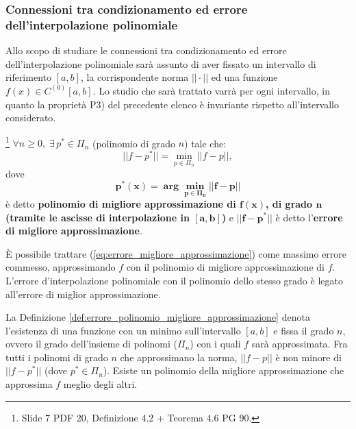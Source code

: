 \subsubsection{Connessioni tra condizionamento ed errore dell'interpolazione polinomiale}
\footnotemark Allo scopo di studiare le connessioni tra condizionamento ed errore dell'interpolazione polinomiale sarà assunto di aver fissato un intervallo di riferimento $[a,b]$, la corrispondente norma $||\cdot||$ ed una funzione $f(x)\in C^{(0)}[a,b]$. Lo studio che sarà trattato varrà per ogni intervallo, in quanto la proprietà P3) del precedente elenco è invariante rispetto all'intervallo considerato.

\begin{definition}\label{def:errore_polinomio_migliore_approssimazione}\footnote{Slide 7 PDF 20, Definizione 4.2 + Teorema 4.6 PG 90.}
    $\forall n\geq 0,\;\exists\, p^*\in\Pi_n$ (polinomio di grado $n$) tale che:
    \begin{equation}\label{eq:errore_migliore_approssimazione}
        ||f-p^*||=\underset{p\in\Pi_n}{\min}||f-p||,
    \end{equation}
    dove
    \begin{equation*}
    	\boldsymbol{p^*(x) = \arg\underset{p\in\Pi_n}{\min}||f-p||}
    \end{equation*}
    è detto \textbf{polinomio di migliore approssimazione di $\boldsymbol{f(x)}$, di grado $\boldsymbol n$ (tramite le ascisse di interpolazione in $\boldsymbol{[a,b]}$)} e $\boldsymbol{||f-p^*||}$ è detto l'\textbf{errore di migliore approssimazione}.
\end{definition}

\begin{remark}
    È possibile trattare (\ref{eq:errore_migliore_approssimazione}) come massimo errore commesso, approssimando $f$ con il polinomio di migliore approssimazione di $f$. L'errore d'interpolazione polinomiale con il polinomio dello stesso grado è legato all'errore di miglior approssimazione.
\end{remark}

La Definizione \ref{def:errore_polinomio_migliore_approssimazione} denota l'esistenza di una funzione con un minimo sull'intervallo $[a,b]$ e fissa il grado $n$, ovvero il grado dell'insieme di polinomi ($\Pi_n$) con i quali $f$ sarà approssimata.
Fra tutti i polinomi di grado $n$ che approssimano la norma, $||f-p||$ è non minore di $||f-p^*||$ (dove $p^*\in\Pi_n$). Esiste un polinomio della migliore approssimazione che approssima $f$ meglio degli altri.

